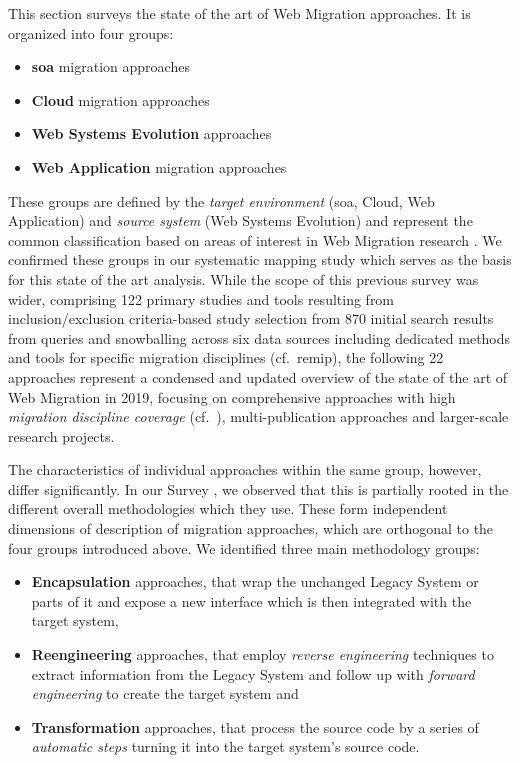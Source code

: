 This section surveys the state of the art of \gls{Web Migration} approaches.
It is organized into four groups:
\begin{itemize}
\tightlist
\item
  \textbf{\gls{soa}} migration approaches
\item
  \textbf{Cloud} migration approaches
\item
  \textbf{\gls{Web Systems Evolution}} approaches
\item
	\textbf{\gls{Web Application}} migration approaches
\end{itemize}
These groups are defined by the \emph{target environment} (\gls{soa}, Cloud, \gls{Web Application}) and \emph{source system} (\gls{Web Systems Evolution}) and represent the common classification based on areas of interest in \gls{Web Migration} research  \autocite{Kienle2014EvolutionWeb}.
We confirmed these groups in our systematic mapping study \autocite{Heil2017Survey} which serves as the basis for this state of the art analysis.
While the scope of this previous survey was wider, comprising 122 primary studies and tools resulting from inclusion/exclusion criteria-based study selection from 870 initial search results from queries and snowballing across six data sources including dedicated methods and tools for specific migration disciplines (cf.~\gls{remip}), the following 22 approaches represent a condensed and updated overview of the state of the art of \gls{Web Migration} in 2019, focusing on comprehensive approaches with high \emph{migration discipline coverage} (cf.~\autocite{Heil2017Survey}), multi-publication approaches and larger-scale research projects.

The characteristics of individual approaches within the same group, however, differ significantly.
In our Survey \autocite{Heil2017Survey}, we observed that this is partially rooted in the different overall methodologies which they use.
These form independent dimensions of description of migration approaches, which are orthogonal to the four groups introduced above.
We identified three main methodology groups:

\begin{itemize}
\tightlist
\item
  \textbf{\gls{Encapsulation}} approaches, that wrap the unchanged \gls{Legacy System} or parts of it and expose a new interface \autocite[cf.~to \emph{external interface}, \emph{internal implementation} in \emph{encapsulation} definition][]{ISO/IEEE24765Vocabulary} which is then integrated with the \gls{target system},
\item
  \textbf{\gls{Reengineering}} approaches, that employ \emph{reverse engineering} techniques to extract information from the \gls{Legacy System} and follow up with \emph{forward engineering} to create the \gls{target system} \autocite[cf.~also to \gls{iso}/\gls{ieee} reengineering definition in][]{ISO/IEEE24765Vocabulary,IEEE1219Maintenance} and
\item
  \textbf{\gls{Transformation}} approaches, that process the  source code by a series of \emph{automatic steps} turning it into the \gls{target system}'s source code.
\end{itemize}

